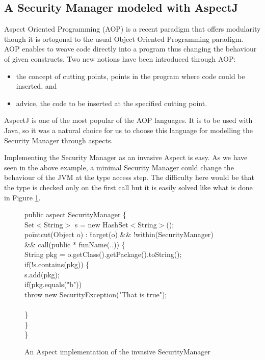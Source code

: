 \subsection{A Security Manager modeled with AspectJ}
Aspect Oriented Programming (AOP) is a recent paradigm that offers
modularity though it is ortogonal to the usual Object Oriented
Programming paradigm. AOP enables to weave code directly into a
program thus changing the behaviour of given constructs. Two new
notions have been introduced through AOP:
\begin{itemize}
\item the concept of cutting points, points in the program where code
could be inserted, and
\item advice, the code to be inserted at the specified cutting point.
\end{itemize}
AspectJ is one of the most popular of the AOP languages. It is to be
used with Java, so it was a natural choice for us to choose this
language for modelling the Security Manager through aspects.

Implementing the Security Manager as an invasive Aspect is easy.  As
we have seen in the above example, a minimal Security Manager could
change the behaviour of the JVM at the type access step. The
difficulty here would be that the type is checked only on the first
call but it is easily solved like what is done in Figure \ref{base_implem}.
%
\begin{figure}
\bcode
pu\=blic aspect SecurityManager \{\+\\

Set$<$String$>$ s = new HashSet$<$String$>$();\\
po\=intcut(Object o) : \=target(o) \&\& !within(SecurityManager)\+ \\
           \>\&\& call(public * funName(..)) \{\\
    String pkg = o.getClass().getPackage().toString();\\
    if\=(!s.contains(pkg)) \{\+\\     
       s.add(pkg);\\
       if\=(pkg.equals("b"))\\
           \>throw new SecurityException("That is true");\\\-\\ 
    \}\-\\
\}\-\\
\}
\ecode
\caption{An Aspect implementation of the invasive SecurityManager}
\label{base_implem}
\end{figure}


